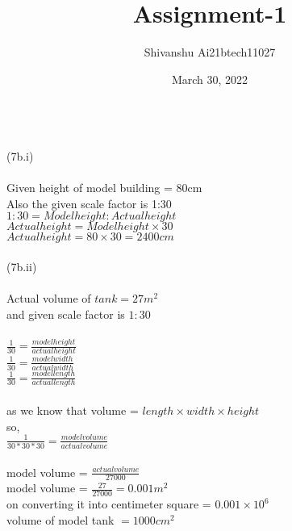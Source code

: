 \documentclass[12pt,twocolumn]{article}
\title{Assignment-1}
\author{Shivanshu     Ai21btech11027}
\date{March 30, 2022}
\begin{document}
\maketitle
\vspace{2mm}\\
(7b.i)\\
\vspace{1mm}\\
Given height of model building = 80cm\\
Also the given scale factor is 1:30\\
\rightarrow $1 : 30 = Model height : Actual height$\\
\rightarrow $Actual height = Model height\times 30$\\
\rightarrow$ Actual height = 80 \times 30 = 2400 cm $\\
\vspace{2mm}\\
(7b.ii)\\
\vspace{1mm}\\
Actual volume of $tank = 27m^2 $\\
 and given  scale factor is $ 1:30 $\\
\vspace{1mm}\\
$\frac{1}{30} = \frac{model height}{actual height}$ \\
$\frac{1}{30} = \frac{model width}{actual width}$ \\
$\frac{1}{30} = \frac{model length}{actual length} $\\
\vspace{1mm}\\
as we know that volume = $length\times width\times height$\\
so, \\
$\frac{1}{30*30*30} = \frac{model volume}{actual volume} $\\
\vspace{1mm}\\
model volume = $\frac{actual volume}{27000} $\\
model volume = $\frac{27}{27000} = 0.001m^2$\\
on converting it into centimeter square = $0.001 \times 10^6$\\
volume of model tank $= 1000 cm^2$\\
\end{document}
